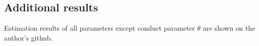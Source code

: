 \documentclass[11pt, a4paper]{article}
\begin{document}


\subsection{Additional results}
Estimation results of all parameters except conduct parameter $\theta$ are shown on the author's github.
\end{document}
